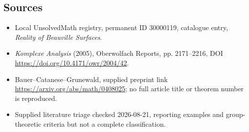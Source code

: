 \documentclass[11pt]{article}
\begin{document}
\subsection{Sources}
\begin{itemize}
\item Local UnsolvedMath registry, permanent ID 30000119, catalogue entry, \emph{Reality of Beauville Surfaces}.
\item \emph{Komplexe Analysis} (2005), Oberwolfach Reports, pp. 2171--2216, DOI \url{https://doi.org/10.4171/owr/2004/42}.
\item Bauer--Catanese--Grunewald, supplied preprint link \url{https://arxiv.org/abs/math/0408025}; no full article title or theorem number is reproduced.
\item Supplied literature triage checked 2026-08-21, reporting examples and group-theoretic criteria but not a complete classification.
\end{itemize}
\end{document}
